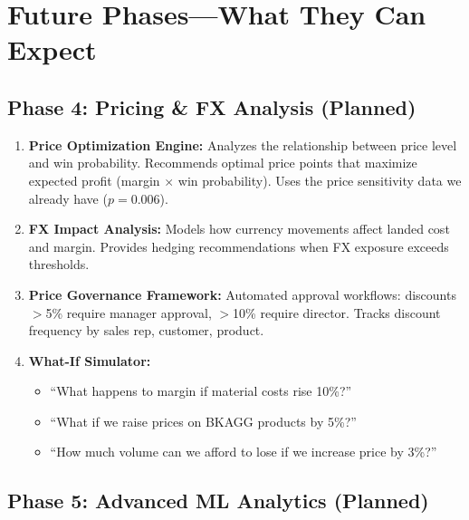 \documentclass[11pt,a4paper]{article}
\begin{document}
\section{Future Phases---What They Can Expect}

\subsection{Phase 4: Pricing \& FX Analysis (Planned)}

\begin{enumerate}
  \item \textbf{Price Optimization Engine:} Analyzes the relationship between price level and win probability. Recommends optimal price points that maximize expected profit (margin $\times$ win probability). Uses the price sensitivity data we already have ($p = 0.006$).

  \item \textbf{FX Impact Analysis:} Models how currency movements affect landed cost and margin. Provides hedging recommendations when FX exposure exceeds thresholds.

  \item \textbf{Price Governance Framework:} Automated approval workflows: discounts $>$5\% require manager approval, $>$10\% require director. Tracks discount frequency by sales rep, customer, product.

  \item \textbf{What-If Simulator:}
  \begin{itemize}[nosep]
    \item ``What happens to margin if material costs rise 10\%?''
    \item ``What if we raise prices on BKAGG products by 5\%?''
    \item ``How much volume can we afford to lose if we increase price by 3\%?''
  \end{itemize}
\end{enumerate}

\subsection{Phase 5: Advanced ML Analytics (Planned)}
\end{document}

